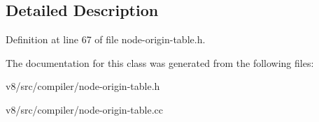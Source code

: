 \subsection{Detailed Description}


Definition at line 67 of file node-\/origin-\/table.\+h.



The documentation for this class was generated from the following files\+:\begin{DoxyCompactItemize}
\item 
v8/src/compiler/node-\/origin-\/table.\+h\item 
v8/src/compiler/node-\/origin-\/table.\+cc\end{DoxyCompactItemize}
